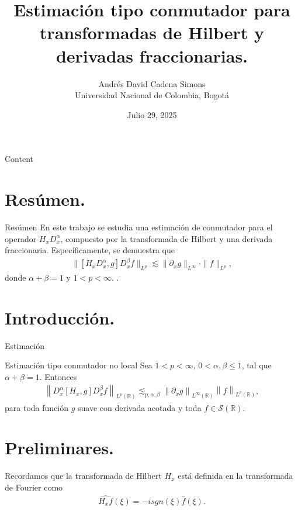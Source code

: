 \documentclass[9pt]{beamer}
\title{Estimación tipo conmutador para transformadas de Hilbert y derivadas fraccionarias.}
\author{\texorpdfstring{ 
Andrés David Cadena Simons \\
Universidad Nacional de Colombia, Bogotá}{A}}
\institute{ }
\date{\footnotesize Julio 29, 2025}
\providecommand{\norm}[1]{\left\|#1\right\|}
\begin{document}
\begin{frame}
  \titlepage

\end{frame}


\begin{frame}{Content}
  \tableofcontents
\end{frame}

\section{Resúmen.}

\begin{frame}{Resúmen}
  En este trabajo se estudia una estimación de conmutador para el operador $H_x D_x^\alpha$, compuesto por la transformada de Hilbert y una derivada fraccionaria. Específicamente, se demuestra que
  \begin{align*}
    \| [H_x D_x^\alpha, g] D_x^\beta f \|_{L^p} \lesssim \| \partial_x g \|_{L^\infty} \cdot \|f\|_{L^p},
  \end{align*}
  donde $\alpha + \beta = 1$ y $1 < p < \infty$.
  \cite{zbMATH07319426}.
\end{frame}

\section{Introducción.}

\begin{frame}{Estimación}
  \begin{block}{Estimación tipo conmutador no local}
    Sea $1 < p < \infty$, $0 < \alpha, \beta \leq 1$, tal que $\alpha + \beta = 1$. Entonces
    \begin{align*}
      \norm{D_x^{\alpha} [H_x, g] D_x^{\beta} f}_{L^p(\mathbb{R})} \lesssim_{p,\alpha,\beta} \norm{\partial_x g}_{L^\infty(\mathbb{R})}\norm{f}_{L^p(\mathbb{R})}, 
    \end{align*}
    para toda función $g$ suave con derivada acotada y toda $f \in \mathcal{S}(\mathbb{R})$.
  \end{block}
\end{frame}

\section{Preliminares.}

\begin{frame}{}
  Recordamos que la transformada de Hilbert $H_x$ está definida en la transformada de Fourier como
  \begin{align*}
    \hat{H_x f}(\xi) = -isgn(\xi) \hat{f}(\xi). 
  \end{align*}  
\end{frame}
\end{document}
